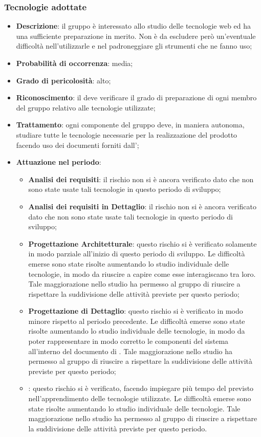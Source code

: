 		\subsubsection{Tecnologie adottate}
		\begin{itemize}
			\item \textbf{Descrizione}: il gruppo è interessato allo studio delle tecnologie web ed ha una sufficiente preparazione in merito. Non è da escludere però un'eventuale difficoltà nell'utilizzarle e nel padroneggiare gli strumenti che ne fanno uso;
			\item \textbf{Probabilità di occorrenza}: media;
			\item \textbf{Grado di pericolosità}: alto;
			\item \textbf{Riconoscimento}: il \textit{\Res} deve verificare il grado di preparazione di ogni membro del gruppo relativo alle tecnologie utilizzate;	
			\item \textbf{Trattamento}: ogni componente del gruppo deve, in maniera autonoma, studiare tutte le tecnologie necessarie per la realizzazione del prodotto facendo uso dei documenti forniti dall'\textit{\Amm};
			\item \textbf{Attuazione nel periodo}:
				\begin{itemize}
					\item \textbf{Analisi dei requisiti}: il rischio non si è ancora verificato dato che non sono state usate tali tecnologie in questo periodo di sviluppo;
					\item \textbf{Analisi dei requisiti in Dettaglio}: il rischio non si è ancora verificato dato che non sono state usate tali tecnologie in questo periodo di sviluppo;
					\item \textbf{Progettazione Architetturale}: questo rischio si è verificato solamente in modo parziale all'inizio di questo periodo di sviluppo. Le difficoltà emerse sono state risolte aumentando lo studio individuale delle tecnologie, in modo da riuscire a capire come esse interagiscano tra loro. Tale maggiorazione nello studio ha permesso al gruppo di riuscire a rispettare la suddivisione delle attività previste per questo periodo; 
					\item \textbf{Progettazione di Dettaglio}: questo rischio si è verificato in modo minore rispetto al periodo precedente. Le difficoltà emerse sono state risolte aumentando lo studio individuale delle tecnologie, in modo da poter rappresentare in modo corretto le componenti del sistema all'interno del documento di \textit{\DdPv}. Tale maggiorazione nello studio ha permesso al gruppo di riuscire a rispettare la suddivisione delle attività previste per questo periodo;
					\item \textbf{\CO}: questo rischio si è verificato, facendo impiegare più tempo del previsto nell'apprendimento delle tecnologie utilizzate. Le difficoltà emerse sono state risolte aumentando lo studio individuale delle tecnologie. Tale maggiorazione nello studio ha permesso al gruppo di riuscire a rispettare la suddivisione delle attività previste per questo periodo.
				\end{itemize}
		\end{itemize}
		
